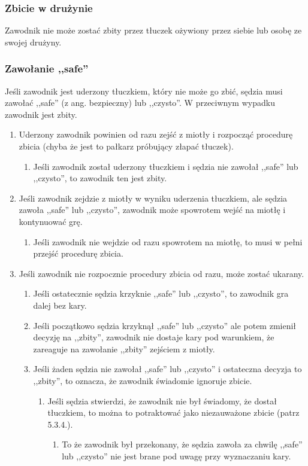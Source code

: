 \documentclass[11pt,a4paper]{article}
\begin{document}
\subsubsection{Zbicie w drużynie}
Zawodnik nie może zostać zbity przez tłuczek ożywiony przez siebie lub osobę ze swojej drużyny.

\subsubsection{Zawołanie ,,safe''}
Jeśli zawodnik jest uderzony tłuczkiem, który nie może go zbić, sędzia musi zawołać ,,safe'' (z ang. bezpieczny) lub ,,czysto''. W przeciwnym wypadku zawodnik jest zbity.
\begin{enumerate}
  \item Uderzony zawodnik powinien od razu zejść z miotły i rozpocząć procedurę zbicia (chyba że jest to pałkarz próbujący złapać tłuczek).
  \begin{enumerate}
    \item Jeśli zawodnik został uderzony tłuczkiem i sędzia nie zawołał ,,safe'' lub ,,czysto'', to zawodnik ten jest zbity.
  \end{enumerate}
  \item Jeśli zawodnik zejdzie z miotły w wyniku uderzenia tłuczkiem, ale sędzia zawoła ,,safe'' lub ,,czysto'', zawodnik może spowrotem wejść na miotłę i kontynuować grę.
  \begin{enumerate}
    \item Jeśli zawodnik nie wejdzie od razu spowrotem na miotłę, to musi w pełni przejść procedurę zbicia.
  \end{enumerate}
  \item Jeśli zawodnik nie rozpocznie procedury zbicia od razu, może zostać ukarany.
  \begin{enumerate}
    \item Jeśli ostatecznie sędzia krzyknie ,,safe'' lub ,,czysto'', to zawodnik gra dalej bez kary.
    \item Jeśli początkowo sędzia krzyknął ,,safe'' lub ,,czysto'' ale potem zmienił decyzję na ,,zbity'', zawodnik nie dostaje kary pod warunkiem, że zareaguje na zawołanie ,,zbity'' zejściem z miotły.
    \item Jeśli żaden sędzia nie zawołał ,,safe'' lub ,,czysto'' i ostateczna decyzja to ,,zbity'', to oznacza, że zawodnik świadomie ignoruje zbicie.
    \begin{enumerate}
      \item Jeśli sędzia stwierdzi, że zawodnik nie był świadomy, że dostał tłuczkiem, to można to potraktować jako niezauważone zbicie (patrz 5.3.4.). %
      \begin{enumerate}
        \item To że zawodnik był przekonany, że sędzia zawoła za chwilę ,,safe'' lub ,,czysto'' nie jest brane pod uwagę przy wyznaczaniu kary.
      \end{enumerate}
    \end{enumerate}
  \end{enumerate}
\end{enumerate}
\end{document}
